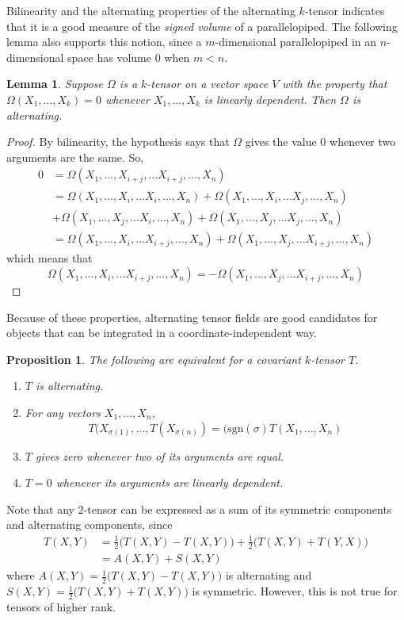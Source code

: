 \documentclass{article}
\newtheorem{proposition}[theorem]{Proposition}
\newtheorem{lemma}[theorem]{Lemma}
\theoremstyle{remark}
\theoremstyle{definition}
\begin{document}
Bilinearity and the alternating properties of the alternating $k$-tensor indicates that it is a good measure of the \textit{signed volume} of a parallelopiped. The following lemma also supports this notion, since a $m$-dimensional parallelopiped in an $n$-dimensional space has volume $0$ when $m < n$. 

\begin{lemma}
Suppose $\Omega$ is a $k$-tensor on a vector space $V$ with the property that $\Omega(X_1, ..., X_k) = 0$ whenever $X_1, ..., X_k$ is linearly dependent. Then $\Omega$ is alternating.
\end{lemma}
\begin{proof}
By bilinearity, the hypothesis says that $\Omega$ gives the value $0$ whenever two arguments are the same. So, 
\begin{align*}
    0 & = \Omega(X_1, ..., X_{i+j}, ... X_{i+j}, ..., X_n)  \\
    & = \Omega(X_1, ..., X_{i}, ... X_{i}, ..., X_n) + \Omega(X_1, ..., X_{i}, ... X_{j}, ..., X_n) \\
    & + \Omega(X_1, ..., X_{j}, ... X_{i}, ..., X_n) + \Omega(X_1, ..., X_{j}, ... X_{j}, ..., X_n) \\
    & = \Omega(X_1, ..., X_{i}, ... X_{i+j}, ..., X_n) + \Omega(X_1, ..., X_{j}, ... X_{i+j}, ..., X_n)
\end{align*}
which means that 
\[\Omega(X_1, ..., X_{i}, ... X_{i+j}, ..., X_n) = - \Omega(X_1, ..., X_{j}, ... X_{i+j}, ..., X_n)\]
\end{proof}

Because of these properties, alternating tensor fields are good candidates for objects that can be integrated in a coordinate-independent way. 

\begin{proposition}
The following are equivalent for a covariant $k$-tensor $T$. 
\begin{enumerate}
    \item $T$ is alternating. 
    \item For any vectors $X_1, ..., X_n$, 
    \[T(X_{\sigma(1)}, ..., T(X_{\sigma(n)}) = (\text{sgn}(\sigma) T(X_1, ..., X_n)\]
    \item $T$ gives zero whenever two of its arguments are equal. 
    \item $T = 0$ whenever its arguments are linearly dependent.
\end{enumerate}
\end{proposition}

Note that any $2$-tensor can be expressed as a sum of its symmetric components and alternating components, since
\begin{align*}
    T(X, Y) & = \frac{1}{2} \big( T(X, Y) - T(X, Y)\big) + \frac{1}{2} \big( T(X, Y) + T(Y, X) \big) \\
    & = A(X, Y) + S(X, Y)
\end{align*}
where $A(X, Y) = \frac{1}{2} \big( T(X, Y) - T(X, Y) \big)$ is alternating and $S (X, Y) = \frac{1}{2} \big( T(X, Y) + T(X, Y) \big)$ is symmetric. However, this is not true for tensors of higher rank. 
\end{document}
